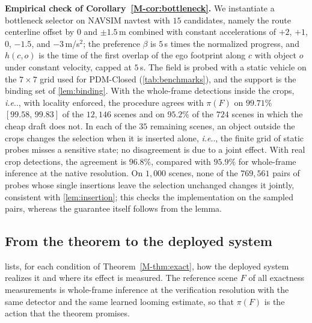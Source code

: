 \documentclass[10pt,letterpaper]{article}
\makeatletter
\DeclareRobustCommand\onedot{\futurelet\@let@token\@onedot}
\def\@onedot{\ifx\@let@token.\else.\null\fi\xspace}
\def\ie{\emph{i.e}\onedot} \def\Ie{\emph{I.e}\onedot}
\newcommand{\full}{F}
\newcommand{\policy}{\pi}
\newcommand{\ci}[2]{[#1,\allowbreak\,#2]}
\theoremstyle{remark}
\theoremstyle{plain}
\theoremstyle{definition}
\newcommand{\mrefnum}[1]{\ref*{M-#1}}
\makeatother
\begin{document}
\textbf{Empirical check of Corollary~\mrefnum{cor:bottleneck}.}
We instantiate a bottleneck selector on NAVSIM navtest with $15$ candidates, namely the route centerline offset by $0$ and $\pm1.5$\,m combined with constant accelerations of $+2$, $+1$, $0$, $-1.5$, and $-3$\,m/s$^2$; the preference $\beta$ is $5$\,s times the normalized progress, and $h(c,o)$ is the time of the first overlap of the ego footprint along $c$ with object $o$ under constant velocity, capped at $5$\,s.
The field is probed with a static vehicle on the $7\times7$ grid used for PDM-Closed (\cref{tab:benchmarks}), and the support is the binding set of \cref{lem:binding}.
With the whole-frame detections inside the crops, \ie, with locality enforced, the procedure agrees with $\policy(\full)$ on $99.71\%$ $\ci{99.58}{99.83}$ of the $12{,}146$ scenes and on $95.2\%$ of the $724$ scenes in which the cheap draft does not.
In each of the $35$ remaining scenes, an object outside the crops changes the selection when it is inserted alone, \ie, the finite grid of static probes misses a sensitive state; no disagreement is due to a joint effect.
With real crop detections, the agreement is $96.8\%$, compared with $95.9\%$ for whole-frame inference at the native resolution.
On $1{,}000$ scenes, none of the $769{,}561$ pairs of probes whose single insertions leave the selection unchanged changes it jointly, consistent with \cref{lem:insertion}; this checks the implementation on the sampled pairs, whereas the guarantee itself follows from the lemma.

\subsection{From the theorem to the deployed system}
\label{sec:theory_practice}

 lists, for each condition of Theorem~\mrefnum{thm:exact}, how the deployed system realizes it and where its effect is measured.
The reference scene $\full$ of all exactness measurements is whole-frame inference at the verification resolution with the same detector and the same learned looming estimate, so that $\policy(\full)$ is the action that the theorem promises.
\end{document}
